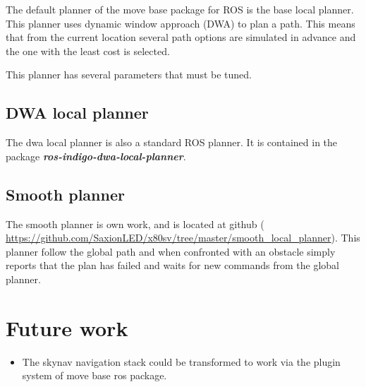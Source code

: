 \documentclass[a4paper]{article}
\newcommand{\rospackage}[1]{\textbf{\textit{#1}}}
\begin{document}
The default planner of the move base package for ROS is the base local planner.
This planner uses dynamic window approach (DWA) to plan a path. This means that from the current 
location several path options are simulated in advance and the one with the least cost is selected.

This planner has several parameters that must be tuned.

\subsection{DWA local planner}
The dwa local planner is also a standard ROS planner. It is contained in the package
\rospackage{ros-indigo-dwa-local-planner}.

\subsection{Smooth planner}
The smooth planner is own work, and is located at github (
\url{https://github.com/SaxionLED/x80sv/tree/master/smooth_local_planner}).
This planner follow the global path and when confronted with an obstacle simply
reports that the plan has failed and waits for new commands from the global planner.

\section{Future work}

\begin{itemize}
  \item The skynav navigation stack could be transformed to work via the plugin system of move base ros package.
\end{itemize}
\end{document}
